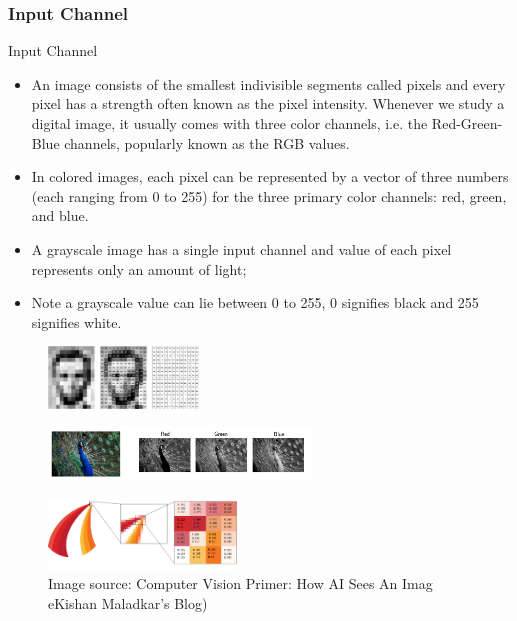 
\frametitle{Input Channel}

\begin{vbframe}{Input Channel}
    \begin{itemize}
       \item An image consists of the smallest indivisible segments called pixels and every pixel has a strength often known as the pixel intensity. Whenever we study a digital image, it usually comes with three color channels, i.e. the Red-Green-Blue channels, popularly known as the RGB values. 
       \item In colored images, each pixel can be represented by a vector of three numbers (each ranging from 0 to 255) for the three primary color channels: red, green, and blue.
       \item A grayscale image has a single input channel and value of each pixel represents only an amount of light; 
       \item Note a grayscale value can lie between 0 to 255, 0 signifies black and 255 signifies white. 
    \end{itemize}


 \begin{figure}
    \centering
    \includegraphics[width=4cm]{plots/05_conv_variations/channels/gray.png}
  \end{figure}

 \begin{figure}
    \centering
    \includegraphics[width=7cm]{plots/05_conv_variations/channels/RGB.jpeg}
  \end{figure}

 \begin{figure}
    \centering
    \includegraphics[width=5cm]{plots/05_conv_variations/channels/RGB-1.png}
    \caption{\tiny Image source: Computer Vision Primer: How AI Sees An Imag eKishan Maladkar's Blog)}
  \end{figure}


\end{vbframe}
